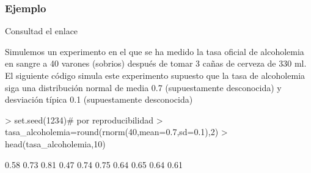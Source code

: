 \documentclass[12pt,t]{beamer}
\newcommand{\MYhref}[3][blue]{\href{#2}{\color{#1}{#3}}}%
\theoremstyle{plain}
\theoremstyle{definition}
\begin{document}
%
%
%
%
%


\begin{frame}[fragile]
\frametitle{Ejemplo}
\vspace*{-2ex}
Consultad el enlace \MYhref[green]{https://twitter.com/guardiacivil/status/805154653977608192/photo/1}{Guardia civil informa...}

Simulemos un experimento en el que se ha medido la tasa oficial  de  alcoholemia en sangre a 40 varones (sobrios) después de tomar 3 cañas de cerveza de 330 ml.
El siguiente código simula este experimento supuesto que la tasa de alcoholemia siga una distribución normal de media 0.7 (supuestamente desconocida) y desviación típica 0.1 (supuestamente desconocida)



\begin{Schunk}
\begin{Sinput}
> set.seed(1234)# por reproducibilidad
> tasa_alcoholemia=round(rnorm(40,mean=0.7,sd=0.1),2)
> head(tasa_alcoholemia,10)
\end{Sinput}
\begin{Soutput}
 [1] 0.58 0.73 0.81 0.47 0.74 0.75 0.64 0.65 0.64 0.61
\end{Soutput}
\end{Schunk}
\end{frame}
\end{document}
